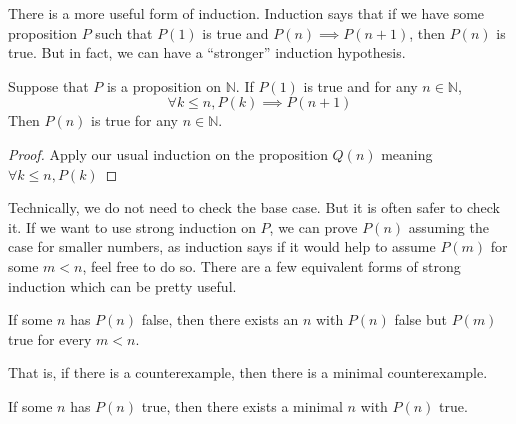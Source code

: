 There is a more useful form of induction.
Induction says that if we have some proposition $P$ such that $P(1)$ is true and $P(n)\implies P(n+1)$, then $P(n)$ is true.
But in fact, we can have a ``stronger'' induction hypothesis.
\begin{theorem}
    Suppose that $P$ is a proposition on $\mathbb N$.
    If $P(1)$ is true and for any $n\in\mathbb N$,
    $$\forall k\le n, P(k)\implies P(n+1)$$
    Then $P(n)$ is true for any $n\in\mathbb N$.
\end{theorem}
\begin{proof}
    Apply our usual induction on the proposition $Q(n)$ meaning
    $\forall k\le n, P(k)$
\end{proof}
Technically, we do not need to check the base case.
But it is often safer to check it.
If we want to use strong induction on $P$, we can prove $P(n)$ assuming the case for smaller numbers, as induction says if it would help to assume $P(m)$ for some $m<n$, feel free to do so.
There are a few equivalent forms of strong induction which can be pretty useful.
\begin{corollary}
    If some $n$ has $P(n)$ false, then there exists an $n$ with $P(n)$ false but $P(m)$ true for every $m<n$.
\end{corollary}
That is, if there is a counterexample, then there is a minimal counterexample.
\begin{corollary}
    If some $n$ has $P(n)$ true, then there exists a minimal $n$ with $P(n)$ true.
\end{corollary}